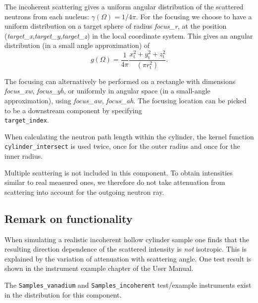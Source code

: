 The incoherent scattering gives
a uniform angular distribution of the scattered
neutrons from each nucleus: $\gamma(\Omega) = 1/4\pi$.
For the focusing we choose to have a uniform distribution on
a target sphere of radius \textit{focus\_r}, at the position
(\textit{target\_x},\textit{target\_y},\textit{target\_z})
in the local coordinate system.
This gives an angular distribution (in a small angle approximation)
of
\begin{equation}
g(\Omega) = \frac{1}{4\pi}
  \frac{x_\textrm{t}^2+y_\textrm{t}^2+z_\textrm{t}^2}{(\pi r_\textrm{t}^2)}.
\end{equation}

The focusing can alternatively be performed on a rectangle with dimensions
\textit{focus\_xw}, \textit{focus\_yh}, or uniformly in angular space
(in a small-angle approximation),
using \textit{focus\_aw}, \textit{focus\_ah}.
The focusing location can be picked to be a downstream component by
specifying \\
\verb+target_index+.

When calculating the neutron path length within
the cylinder, the kernel function \\
\verb+cylinder_intersect+
is used twice, once for the outer radius and once
for the inner radius.

Multiple scattering is not included in this component. To obtain
intensities similar to real measured ones, we therefore do not
take attenuation from scattering into account for the outgoing
neutron ray.

\subsection{Remark on functionality}
When simulating a realistic incoherent hollow cylinder sample
one finds that  the resulting direction dependence
of the scattered intensity is {\em not} isotropic.
This is explained by the variation of attenuation with
scattering angle.
One test result is shown in the instrument example chapter of the \MCS User Manual.

The \verb+Samples_vanadium+ and \verb+Samples_incoherent+ test/example instruments exist in the distribution for this component.
